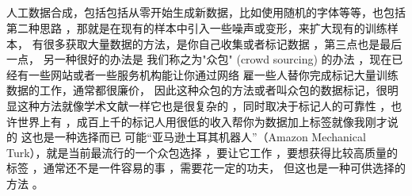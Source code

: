 \documentclass{article}
\begin{document}
\begin{CJK}{UTF8}{gbsn}
\subparagraph{}
人工数据合成，包括包括从零开始生成新数据，比如使用随机的字体等等，也包括第二种思路 ，那就是在现有的样本中引入一些噪声或变形，来扩大现有的训练样本， 有很多获取大量数据的方法，是你自己收集或者标记数据 ，第三点也是最后一点， 另一种很好的办法是 我们称之为"众包" (crowd sourcing) 的办法 ，现在已经有一些网站或者一些服务机构能让你通过网络 雇一些人替你完成标记大量训练数据的工作，通常都很廉价， 因此这种众包的方法或者叫众包的数据标记，很明显这种方法就像学术文献一样它也是很复杂的 ，同时取决于标记人的可靠性 ，也许世界上有 ，成百上千的标记人用很低的收入帮你为数据加上标签就像我刚才说的 这也是一种选择而已 可能“亚马逊土耳其机器人”（Amazon Mechanical Turk），就是当前最流行的一个众包选择 ，要让它工作 ，要想获得比较高质量的标签 ，通常还不是一件容易的事 ，需要花一定的功夫， 但这也是一种可供选择的方法 。
\begin{figure}[H]
\label{fig:2260}
\end{figure}
\begin{figure}[H]
\label{fig:2261}
\end{figure}

\end{CJK}
\end{document}
